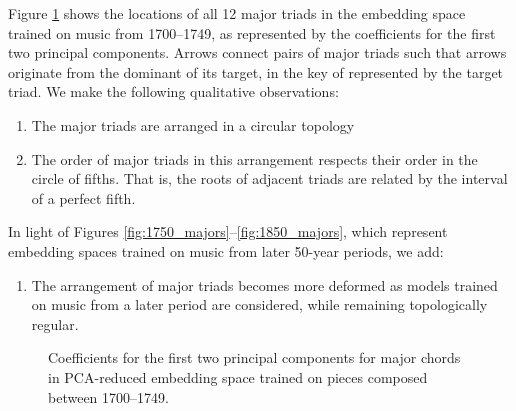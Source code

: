 Figure \ref{fig:1700_majors} shows the locations of all 12 major triads in the embedding space trained on music from 1700--1749, as represented by the coefficients for the first two principal components. Arrows connect pairs of major triads such that arrows originate from the dominant of its target, in the key of represented by the target triad. We make the following qualitative observations:
\begin{enumerate}
\item The major triads are arranged in a circular topology
\item The order of major triads in this arrangement respects their order in the circle of fifths. That is, the roots of adjacent triads are related by the interval of a perfect fifth.
\end{enumerate}
In light of Figures \ref{fig:1750_majors}--\ref{fig:1850_majors}, which represent embedding spaces trained on music from later 50-year periods, we add:
\begin{enumerate}[resume]
\item The arrangement of major triads becomes more deformed as models trained on music from a later period are considered, while remaining topologically regular.
\end{enumerate}


\begin{figure}
 \centerline{}
 \caption{Coefficients for the first two principal components for major chords in PCA-reduced embedding space trained on pieces composed between 1700--1749.}
 \label{fig:1700_majors}
\end{figure}

